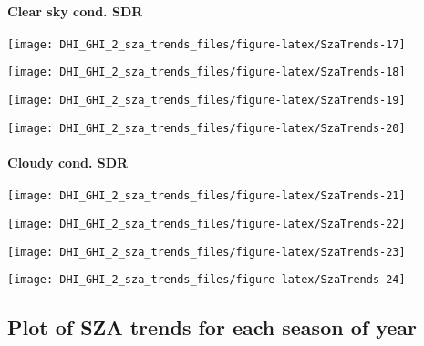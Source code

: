 \documentclass[
  10pt,
  a4paper,oneside]{article}
\begin{document}
\newpage

\hypertarget{clear-sky-cond.-sdr}{%
\paragraph{Clear sky cond. SDR}\label{clear-sky-cond.-sdr}}

\begin{center}\texttt{[image: DHI\_GHI\_2\_sza\_trends\_files/figure-latex/SzaTrends-17]} \end{center}

\begin{center}\texttt{[image: DHI\_GHI\_2\_sza\_trends\_files/figure-latex/SzaTrends-18]} \end{center}

\begin{center}\texttt{[image: DHI\_GHI\_2\_sza\_trends\_files/figure-latex/SzaTrends-19]} \end{center}

\begin{center}\texttt{[image: DHI\_GHI\_2\_sza\_trends\_files/figure-latex/SzaTrends-20]} \end{center}

\newpage

\hypertarget{cloudy-cond.-sdr}{%
\paragraph{Cloudy cond. SDR}\label{cloudy-cond.-sdr}}

\begin{center}\texttt{[image: DHI\_GHI\_2\_sza\_trends\_files/figure-latex/SzaTrends-21]} \end{center}

\begin{center}\texttt{[image: DHI\_GHI\_2\_sza\_trends\_files/figure-latex/SzaTrends-22]} \end{center}

\begin{center}\texttt{[image: DHI\_GHI\_2\_sza\_trends\_files/figure-latex/SzaTrends-23]} \end{center}

\begin{center}\texttt{[image: DHI\_GHI\_2\_sza\_trends\_files/figure-latex/SzaTrends-24]} \end{center}

\hypertarget{plot-of-sza-trends-for-each-season-of-year}{%
\subsection{Plot of SZA trends for each season of year}\label{plot-of-sza-trends-for-each-season-of-year}}
\end{document}

